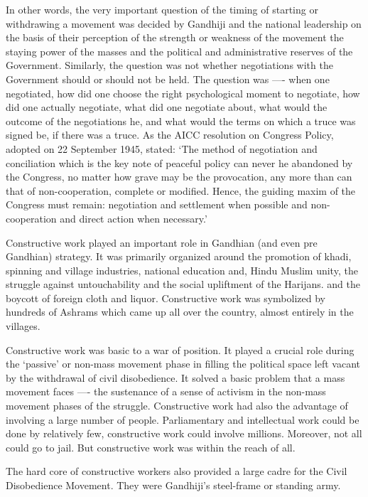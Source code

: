 In other words, the very important question of the timing of starting or withdrawing a movement was decided by Gandhiji and the national leadership on the basis of their perception of the strength or weakness of the movement the staying power of the masses and the political and administrative reserves of the Government. Similarly, the question was not whether negotiations with the Government should or should not be held. The question was —- when one negotiated, how did one choose the right psychological moment to negotiate, how did one actually negotiate, what did one negotiate about, what would the outcome of the negotiations he, and what would the terms on which a truce was signed be, if there was a truce. As the AICC resolution on Congress Policy, adopted on 22 September 1945, stated: `The method of negotiation and conciliation which is the key note of peaceful policy can never he abandoned by the Congress, no matter how grave may be the provocation, any more than can that of non-cooperation, complete or modified. Hence, the guiding maxim of the Congress must remain: negotiation and settlement when possible and non-cooperation and direct action when necessary.'

Constructive work played an important role in Gandhian (and even pre Gandhian) strategy. It was primarily organized around the promotion of khadi, spinning and village industries, national education and, Hindu Muslim unity, the struggle against untouchability and the social upliftment of the Harijans. and the boycott of foreign cloth and liquor. Constructive work was symbolized by hundreds of Ashrams which came up all over the country, almost entirely in the villages.

Constructive work was basic to a war of position. It played a crucial role during the `passive' or non-mass movement phase in filling the political space left vacant by the withdrawal of civil disobedience. It solved a basic problem that a mass movement faces —- the sustenance of a sense of activism in the non-mass movement phases of the struggle. Constructive work had also the advantage of involving a large number of people. Parliamentary and intellectual work could be done by relatively few, constructive work could involve millions. Moreover, not all could go to jail. But constructive work was within the reach of all.

The hard core of constructive workers also provided a large cadre for the Civil Disobedience Movement. They were Gandhiji's steel-frame or standing army.

